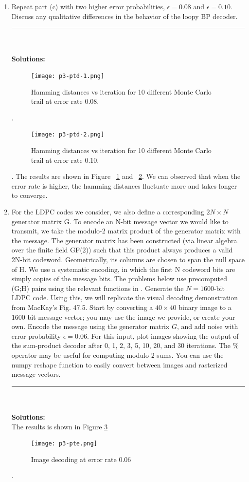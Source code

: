 \documentclass{article}
\begin{document}
\begin{enumerate}
\begin{enumerate}
\pagebreak
\item Repeat part (c) with two higher error probabilities, $\epsilon = 0.08$ and $\epsilon = 0.10$. Discuss any qualitative differences in the behavior of the loopy BP decoder.
\\
\noindent\rule{14cm}{2pt}
\\
\\
\textbf{Solutions:}
\\
\begin{figure}
\texttt{[image: p3-ptd-1.png]}
\centering
\caption{Hamming distances vs iteration for 10 different Monte Carlo trail at error rate 0.08.}
\label{fig:p3-ptd-1}
\end{figure}.
\begin{figure}
\texttt{[image: p3-ptd-2.png]}
\centering
\caption{Hamming distances vs iteration for 10 different Monte Carlo trail at error rate 0.10.}
\label{fig:p3-ptd-2}
\end{figure}.
The results are shown in Figure ~\ref{fig:p3-ptd-1} and ~\ref{fig:p3-ptd-2}. We can observed that when the error rate is higher, the hamming distances fluctuate more and takes longer to converge.

\pagebreak
\item For the LDPC codes we consider, we also define a corresponding $2N\times N$ generator matrix G. To encode an N-bit message vector we would like to transmit, we take the modulo-2 matrix product of the generator matrix with the message. The generator matrix has been constructed (via linear algebra over the  finite field GF(2)) such that this product always produces a valid 2N-bit codeword. Geometrically, its columns are chosen to span the null space of H. We use a systematic encoding, in which the first N codeword bits are simply copies of the message bits. The problems below use precomputed (G;H) pairs using the relevant functions in  . Generate the $N = 1600$-bit LDPC code. Using this, we will replicate the visual decoding demonstration from MacKay's Fig. 47.5. Start by converting a $40\times 40$ binary image to a 1600-bit message vector; you may use the  image we provide, or create your own. Encode the message using the  generator matrix $G$,
and add noise with error probability $\epsilon = 0.06$. For this input, plot images showing the output of the sum-product decoder after 0, 1, 2, 3, 5, 10, 20, and 30 iterations. The \%
operator may be useful for computing modulo-2 sums. You can use the numpy reshape function to easily convert between images and rasterized message vectors.
\\
\noindent\rule{14cm}{2pt}
\\
\\
\textbf{Solutions:}
\\
The results is shown in Figure \ref{fig:p3-pte}
\begin{figure}
\texttt{[image: p3-pte.png]}
\centering
\caption{Image decoding at error rate 0.06}
\label{fig:p3-pte}
\end{figure}.



\end{enumerate}
\end{enumerate}
\end{document}
